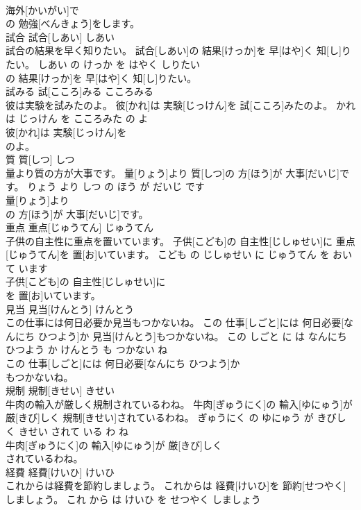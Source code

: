 \documentclass[8pt]{extreport}
\begin{document}
\begin{CJK}{UTF8}{min}
\\	海外[かいがい]で
\\	の 勉強[べんきょう]をします。			
\\	試合	試合[しあい]	しあい	
\\	試合の結果を早く知りたい。	試合[しあい]の 結果[けっか]を 早[はや]く 知[し]りたい。	しあい の けっか を はやく しりたい	
\\	の 結果[けっか]を 早[はや]く 知[し]りたい。			
\\	試みる	試[こころ]みる	こころみる	
\\	彼は実験を試みたのよ。	彼[かれ]は 実験[じっけん]を 試[こころ]みたのよ。	かれ は じっけん を こころみた の よ	
\\	彼[かれ]は 実験[じっけん]を
\\	のよ。			
\\	質	質[しつ]	しつ	
\\	量より質の方が大事です。	量[りょう]より 質[しつ]の 方[ほう]が 大事[だいじ]です。	りょう より しつ の ほう が だいじ です	
\\	量[りょう]より
\\	の 方[ほう]が 大事[だいじ]です。			
\\	重点	重点[じゅうてん]	じゅうてん	
\\	子供の自主性に重点を置いています。	子供[こども]の 自主性[じしゅせい]に 重点[じゅうてん]を 置[お]いています。	こども の じしゅせい に じゅうてん を おいて います	
\\	子供[こども]の 自主性[じしゅせい]に
\\	を 置[お]いています。			
\\	見当	見当[けんとう]	けんとう	
\\	この仕事には何日必要か見当もつかないね。	この 仕事[しごと]には 何日必要[なんにち ひつよう]か 見当[けんとう]もつかないね。	この しごと に は なんにち ひつよう か けんとう も つかない ね	
\\	この 仕事[しごと]には 何日必要[なんにち ひつよう]か
\\	もつかないね。			
\\	規制	規制[きせい]	きせい	
\\	牛肉の輸入が厳しく規制されているわね。	牛肉[ぎゅうにく]の 輸入[ゆにゅう]が 厳[きび]しく 規制[きせい]されているわね。	ぎゅうにく の ゆにゅう が きびしく きせい されて いる わ ね	
\\	牛肉[ぎゅうにく]の 輸入[ゆにゅう]が 厳[きび]しく
\\	されているわね。			
\\	経費	経費[けいひ]	けいひ	
\\	これからは経費を節約しましょう。	これからは 経費[けいひ]を 節約[せつやく]しましょう。	これ から は けいひ を せつやく しましょう	

\end{CJK}
\end{document}
